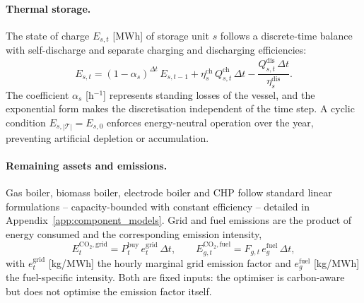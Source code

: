 \paragraph{Thermal storage.}
The state of charge $E_{s,t}$ [MWh] of storage unit $s$ follows a discrete-time balance
with self-discharge and separate charging and discharging efficiencies:
%
\begin{equation}
  E_{s,t} = (1 - \alpha_s)^{\Delta t}\, E_{s,t-1}
    + \eta_s^{\mathrm{ch}}\, Q_{s,t}^{\mathrm{ch}}\, \Delta t
    - \frac{Q_{s,t}^{\mathrm{dis}}\, \Delta t}{\eta_s^{\mathrm{dis}}}.
  \label{eq:storage_soc}
\end{equation}
%
The coefficient $\alpha_s$ [h$^{-1}$] represents standing losses of the vessel, and the
exponential form makes the discretisation independent of the time step. A cyclic
condition $E_{s,|\mathcal{T}|} = E_{s,0}$ enforces energy-neutral operation over the year,
preventing artificial depletion or accumulation.

\paragraph{Remaining assets and emissions.}
Gas boiler, biomass boiler, electrode boiler and CHP follow standard linear formulations
-- capacity-bounded with constant efficiency -- detailed in
Appendix~\ref{app:component_models}. Grid and fuel emissions are the product of energy
consumed and the corresponding emission intensity,
%
\begin{equation}
  E_t^{\mathrm{CO_2,grid}} =
    P_t^{\mathrm{buy}}\, e_t^{\mathrm{grid}}\, \Delta t,
  \qquad
  E_{g,t}^{\mathrm{CO_2,fuel}} =
    F_{g,t}\, e_g^{\mathrm{fuel}}\, \Delta t,
  \label{eq:emissions}
\end{equation}
%
with $e_t^{\mathrm{grid}}$ [kg/MWh] the hourly marginal grid emission factor and
$e_g^{\mathrm{fuel}}$ [kg/MWh] the fuel-specific intensity. Both are fixed inputs: the
optimiser is carbon-aware but does not optimise the emission factor itself.
